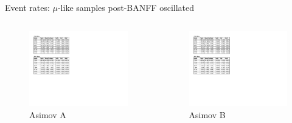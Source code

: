 \documentclass{beamer}
\begin{document}
\begin{frame}{Event rates: $\mu$-like samples post-BANFF oscillated}
	\centering

	\begin{columns}
		\begin{column}{0.5\paperwidth}
			\begin{figure}
				\includegraphics[page=1, trim={0cm 9cm 13cm 1cm}, clip, scale=0.52] {images/rates/postfit_A}
				\caption*{Asimov A}
			\end{figure}
		\end{column}
		\begin{column}{0.5\paperwidth}
			\begin{figure}
				\includegraphics[page=1, trim={0cm 9cm 13cm 1cm}, clip, scale=0.52] {images/rates/postfit_B}
				\caption*{Asimov B}
			\end{figure}
		\end{column}
	\end{columns}
\end{frame}
\end{document}
